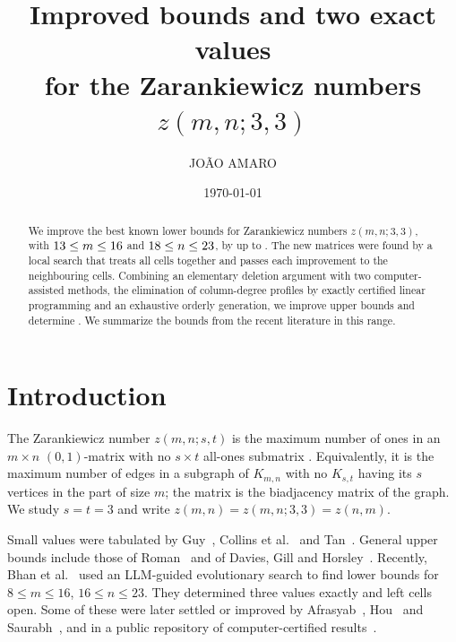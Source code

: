 \documentclass[11pt]{article}
\title{\bfseries\boldmath Improved bounds and two exact values\\ for the Zarankiewicz numbers $z(m,n;3,3)$}
\author{JO\~AO AMARO}
\date{\today}
\begin{document}
\maketitle

\begin{abstract}
We improve the best known lower bounds for \NumImprovedWord{} Zarankiewicz
numbers $z(m,n;3,3)$, with $13\le m\le 16$ and $18\le n\le 23$,
by up to \MaxGain. The new matrices were found by a local search that
treats all cells together and passes each improvement to the neighbouring
cells. Combining an elementary deletion argument with two computer-assisted
methods, the elimination of column-degree profiles by exactly certified
linear programming and an exhaustive orderly generation, we improve
\NumUBImprovedWord{} upper bounds and determine \ClosedList. We summarize
the bounds from the recent literature in this range.
\end{abstract}

\section{Introduction}

The Zarankiewicz number $z(m,n;s,t)$ is the maximum number of ones in an
$m\times n$ $(0,1)$-matrix with no $s\times t$ all-ones submatrix
\cite{Zar51,KST54}. Equivalently, it is the maximum number of edges in a
subgraph of $K_{m,n}$ with no $K_{s,t}$ having its $s$ vertices in the part
of size $m$; the matrix is the biadjacency matrix of the graph. We study
$s=t=3$ and write $z(m,n)=z(m,n;3,3)=z(n,m)$.

Small values were tabulated by Guy~\cite{Guy69}, Collins et
al.~\cite{CRWR16} and Tan~\cite{Tan22}. General upper bounds include those
of Roman~\cite{Rom75} and of Davies, Gill and Horsley~\cite{DGH26}.
Recently, Bhan et al.~\cite{BNRL26} used an LLM-guided evolutionary search
to find lower bounds for $8\le m\le 16$, $16\le n\le 23$. They determined
three values exactly and left \NumOpen{} cells open. Some of these were
later settled or improved by Afrasyab~\cite{Afr26}, Hou~\cite{Hou26} and
Saurabh~\cite{Sau26}, and in a public repository of computer-certified
results~\cite{Fie26}.
\end{document}
